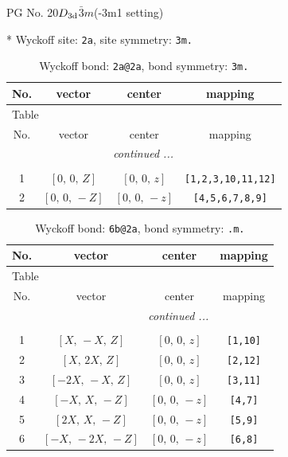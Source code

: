 \documentclass[fleqn,8pt]{jsarticle}
\begin{document}
\setcounter{MaxMatrixCols}{32}

\renewcommand{\tablename}{Table~}
\renewcommand{\figurename}{Figure~}
\begin{center}
\LARGE
PG No. 20\quad$D_{\rm 3d}$\quad$\bar{3}m$\quad(-3m1 setting)\quad[ trigonal ]
\end{center}


* Wyckoff site: {\tt 2a}, site symmetry: {\tt 3m.}
\renewcommand{\arraystretch}{1.2}
\begin{longtable}{cccc}
\caption{Wyckoff bond: {\tt 2a@2a}, bond symmetry: {\tt 3m.}}
 \\
 \hline \hline
No. & vector & center & mapping \\ \hline \endfirsthead

\multicolumn{3}{l}{\tablename\ \thetable{}} \\
 \hline \hline
No. & vector & center & mapping \\ \hline \endhead

 \hline \hline
\multicolumn{3}{r}{\footnotesize\it continued ...} \\ \endfoot

 \hline \hline
\multicolumn{3}{r}{} \\ \endlastfoot

1 & $\left[ 0,\, 0,\, Z \right]$ & $\left[ 0,\, 0,\, z \right]$ & {\tt [1,2,3,10,11,12]} \\ \hline
2 & $\left[ 0,\, 0,\, - Z \right]$ & $\left[ 0,\, 0,\, - z \right]$ & {\tt [4,5,6,7,8,9]} \\
\end{longtable}
\renewcommand{\arraystretch}{1.2}
\begin{longtable}{cccc}
\caption{Wyckoff bond: {\tt 6b@2a}, bond symmetry: {\tt .m.}}
 \\
 \hline \hline
No. & vector & center & mapping \\ \hline \endfirsthead

\multicolumn{3}{l}{\tablename\ \thetable{}} \\
 \hline \hline
No. & vector & center & mapping \\ \hline \endhead

 \hline \hline
\multicolumn{3}{r}{\footnotesize\it continued ...} \\ \endfoot

 \hline \hline
\multicolumn{3}{r}{} \\ \endlastfoot

1 & $\left[ X,\, - X,\, Z \right]$ & $\left[ 0,\, 0,\, z \right]$ & {\tt [1,10]} \\ \hline
2 & $\left[ X,\, 2 X,\, Z \right]$ & $\left[ 0,\, 0,\, z \right]$ & {\tt [2,12]} \\ \hline
3 & $\left[ - 2 X,\, - X,\, Z \right]$ & $\left[ 0,\, 0,\, z \right]$ & {\tt [3,11]} \\ \hline
4 & $\left[ - X,\, X,\, - Z \right]$ & $\left[ 0,\, 0,\, - z \right]$ & {\tt [4,7]} \\ \hline
5 & $\left[ 2 X,\, X,\, - Z \right]$ & $\left[ 0,\, 0,\, - z \right]$ & {\tt [5,9]} \\ \hline
6 & $\left[ - X,\, - 2 X,\, - Z \right]$ & $\left[ 0,\, 0,\, - z \right]$ & {\tt [6,8]} \\
\end{longtable}
\end{document}
